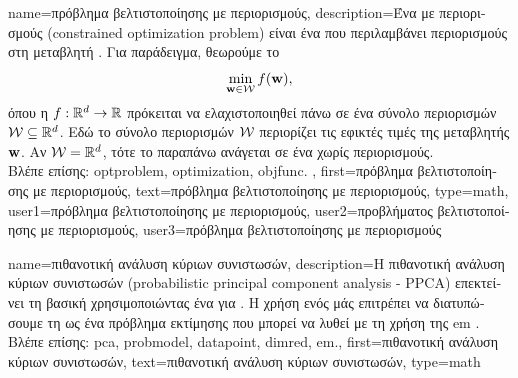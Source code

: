 {name={\foreignlanguage{greek}{πρόβλημα βελτιστοποίησης με περιορισμούς}}, 
	description={\foreignlanguage{greek}{Ένα} 
		 \foreignlanguage{greek}{με περιορισμούς} (constrained optimization problem) \foreignlanguage{greek}{είναι ένα} 
		 \foreignlanguage{greek}{που περιλαμβάνει περιορισμούς στη μεταβλητή} . 
		\foreignlanguage{greek}{Για παράδειγμα, θεωρούμε το} 
		\[
			\min_{{\bf w} \in \mathcal{W}} f({\bf w}),
		\]
		\foreignlanguage{greek}{όπου η}  $f: \mathbb{R}^{d} \to \mathbb{R}$ \foreignlanguage{greek}{πρόκειται 
		να ελαχιστοποιηθεί πάνω σε ένα σύνολο περιορισμών $\mathcal{W} \subseteq \mathbb{R}^{d}$. Εδώ το σύνολο 
		περιορισμών $\mathcal{W}$ περιορίζει τις εφικτές τιμές της μεταβλητής}  ${\bf w}$. 
		\foreignlanguage{greek}{Αν $\mathcal{W} = \mathbb{R}^{d}$, τότε το παραπάνω}  
		\foreignlanguage{greek}{ανάγεται σε ένα}  \foreignlanguage{greek}{χωρίς περιορισμούς}. 
					\\ 
		\foreignlanguage{greek}{Βλέπε επίσης:} \gls{optproblem}, \gls{optimization}, \gls{objfunc}. }, 
	first={\foreignlanguage{greek}{πρόβλημα βελτιστοποίησης με περιορισμούς}}, 
	text={\foreignlanguage{greek}{πρόβλημα βελτιστοποίησης με περιορισμούς}},
	type=math,
	user1={\foreignlanguage{greek}{πρόβλημα βελτιστοποίησης με περιορισμούς}}, %
  	user2={\foreignlanguage{greek}{προβλήματος βελτιστο\-ποί\-ησης με περιορισμούς}}, %
	user3={\foreignlanguage{greek}{πρόβλημα βελτιστοποίησης με περιορισμούς}} %
}%

{name={\foreignlanguage{greek}{πιθανοτική ανάλυση κύριων συνιστωσών}}, 
	description={\foreignlanguage{greek}{Η πιθανοτική ανάλυση κύ\-ριων 
		συνιστωσών} 
		(probabilistic principal component analysis - PPCA) \foreignlanguage{greek}{επεκτείνει τη βασική}  
		\foreignlanguage{greek}{χρησιμοποιώντας ένα}  \foreignlanguage{greek}{για} . 
		\foreignlanguage{greek}{Η χρήση ενός}  \foreignlanguage{greek}{μάς επιτρέπει να διατυπώσουμε τη} 
		 \foreignlanguage{greek}{ως ένα πρόβλημα εκτίμησης που μπορεί να λυθεί με τη χρήση της} 
		\gls{em} \cite{TippingProbPCA}.
				\\
		\foreignlanguage{greek}{Βλέπε επίσης:} \gls{pca}, \gls{probmodel}, \gls{datapoint}, \gls{dimred}, \gls{em}.},
	first={\foreignlanguage{greek}{πιθανοτική ανάλυση κύριων συνιστωσών}},
	text={\foreignlanguage{greek}{πιθανοτική ανάλυση κύριων συνιστωσών}},
	type=math
}

